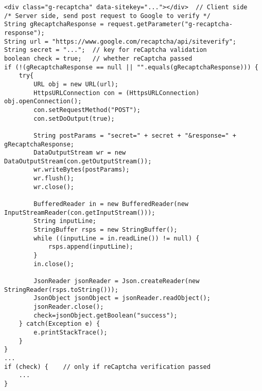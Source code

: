 \begin{lstlisting}
<div class="g-recaptcha" data-sitekey="..."></div>	// Client side
/* Server side, send post request to Google to verify */
String gRecaptchaResponse = request.getParameter("g-recaptcha-response");
String url = "https://www.google.com/recaptcha/api/siteverify";
String secret = "...";	// key for reCaptcha validation
boolean check = true;	// whether reCaptcha passed
if (!(gRecaptchaResponse == null || "".equals(gRecaptchaResponse))) {
	try{
		URL obj = new URL(url);
		HttpsURLConnection con = (HttpsURLConnection) obj.openConnection();
		con.setRequestMethod("POST");
		con.setDoOutput(true);

		String postParams = "secret=" + secret + "&response=" + gRecaptchaResponse;
		DataOutputStream wr = new DataOutputStream(con.getOutputStream());
		wr.writeBytes(postParams);
		wr.flush();
		wr.close();

		BufferedReader in = new BufferedReader(new InputStreamReader(con.getInputStream()));
		String inputLine;
		StringBuffer rsps = new StringBuffer();
		while ((inputLine = in.readLine()) != null) {
			rsps.append(inputLine);
		}
		in.close();

		JsonReader jsonReader = Json.createReader(new StringReader(rsps.toString()));
		JsonObject jsonObject = jsonReader.readObject();
		jsonReader.close();
		check=jsonObject.getBoolean("success");
	} catch(Exception e) {
		e.printStackTrace();
	}
}
...
if (check) {	// only if reCaptcha verification passed
	...
}
\end{lstlisting}
